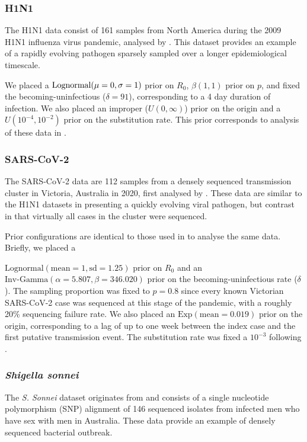 \documentclass{article}
\begin{document}
\begin{spacing}{1.5}
\subsubsection*{H1N1}
The H1N1 data consist of 161 samples from North America during the 2009 H1N1 influenza virus pandemic, analysed by \citet{hedge_2013_real-time}. This  dataset provides an example of a rapidly evolving pathogen sparsely sampled over a longer epidemiological timescale. 

We placed a $\textnormal{Lognormal}(\mu=0,\sigma=1)$ prior on $R_0$, $\beta(1,1)$ prior on $p$, and fixed the becoming-uninfectious ($\delta = 91$), corresponding to a 4 day duration of infection. We also placed an improper ($U(0,\infty)$) prior on the origin and a $U(10^{-4},10^{-2})$ prior on the substitution rate. This prior corresponds to analysis of these data in \citet{featherstone_decoding_2023}.

\subsubsection*{SARS-CoV-2}
The SARS-CoV-2 data are 112 samples from a densely sequenced transmission cluster in Victoria, Australia in 2020, first analysed by \citet{lane2021genomics}. These data are similar to the H1N1 datasets in presenting a quickly evolving viral pathogen, but contrast in that virtually all cases in the cluster were sequenced. 

Prior configurations are identical to those used in \citet{featherstone_decoding_2023} to analyse the same data. Briefly, we placed a 

$\textrm{Lognormal}(\textrm{mean}=1, \textrm{sd}=1.25)$ prior on $R_0$ and an $\textrm{Inv-Gamma}(\alpha=5.807, \beta=346.020)$ prior on the becoming-uninfectious rate ($\delta$).  The sampling proportion was fixed to $p=0.8$ since every known Victorian SARS-CoV-2 case was sequenced at this stage of the pandemic, with a roughly 20\% sequencing failure rate. We also placed an $\textrm{Exp}(\textrm{mean}=0.019)$ prior on the origin, corresponding to a lag of up to one week  between the index case and the first putative transmission event. The substitution rate was fixed a $10^{-3}$ following \citep{duchene_temporal_2020}.

\subsubsection*{\textit{Shigella sonnei}}
The \textit{S. Sonnei} dataset originates from \citet{ingle_co-circulation_2019} and consists of a single nucleotide polymorphism (SNP) alignment of 146 sequenced isolates from infected men who have sex with men in Australia. These data provide an example of densely sequenced bacterial outbreak. 


\end{spacing}
\end{document}
